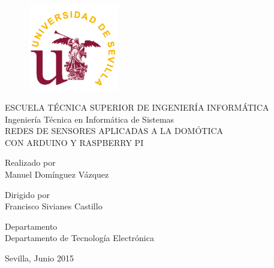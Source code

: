 \begin{titlepage}
\begin{center}
	\begin{figure}[h]
		\centering
			\includegraphics[width=0.35\textwidth]{imagenes/logous.png}
	\end{figure}
	
	\begin{Large}
	\vspace*{1cm}
	ESCUELA TÉCNICA  SUPERIOR DE  INGENIERÍA  INFORMÁTICA\\
	\vspace*{1cm}
	Ingeniería Técnica en Informática de Sistemas\\
    \vspace*{2cm}
    REDES DE SENSORES APLICADAS A LA DOMÓTICA\\
    CON ARDUINO Y RASPBERRY PI\\
	\end{Large}
	\vspace*{2cm}
	Realizado por\\
	Manuel Domínguez Vázquez
	\vspace*{0.5cm}
	
	Dirigido por\\
	Francisco Sivianes Castillo
	\vspace*{0.5cm}
	
	Departamento\\
	Departamento de Tecnología Electrónica\\
\end{center}
	\vspace*{1.5cm}
	\hfill Sevilla, Junio 2015
\end{titlepage}
\cleardoublepage

